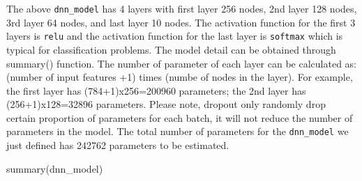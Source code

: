 \documentclass[
  12pt,
]{krantz}
\makeatletter
\newenvironment{Shaded}{\begin{snugshade}}{\end{snugshade}}
\newcommand{\FunctionTok}[1]{\textcolor[rgb]{0,0,0}{#1}}
\newcommand{\NormalTok}[1]{#1}
\newenvironment{kframe}{%
\medskip{}
\setlength{\fboxsep}{.8em}
 \def\at@end@of@kframe{}%
 \ifinner\ifhmode%
  \def\at@end@of@kframe{\end{minipage}}%
  \begin{minipage}{\columnwidth}%
 \fi\fi%
 \def\FrameCommand##1{\hskip\@totalleftmargin \hskip-\fboxsep
 \colorbox{shadecolor}{##1}\hskip-\fboxsep
     \hskip-\linewidth \hskip-\@totalleftmargin \hskip\columnwidth}%
 \MakeFramed {\advance\hsize-\width
   \@totalleftmargin\z@ \linewidth\hsize
   \@setminipage}}%
 {\par\unskip\endMakeFramed%
 \at@end@of@kframe}
\renewenvironment{Shaded}{\begin{kframe}}{\end{kframe}}
\makeatother
\begin{document}
The above \texttt{dnn\_model} has 4 layers with first layer 256 nodes, 2nd layer 128 nodes, 3rd layer 64 nodes, and last layer 10 nodes. The activation function for the first 3 layers is \texttt{relu} and the activation function for the last layer is \texttt{softmax} which is typical for classification problems. The model detail can be obtained through summary() function. The number of parameter of each layer can be calculated as: (number of input features +1) times (numbe of nodes in the layer). For example, the first layer has (784+1)x256=200960 parameters; the 2nd layer has (256+1)x128=32896 parameters. Please note, dropout only randomly drop certain proportion of parameters for each batch, it will not reduce the number of parameters in the model. The total number of parameters for the \texttt{dnn\_model} we just defined has 242762 parameters to be estimated.

\begin{Shaded}
\begin{Highlighting}[]
\FunctionTok{summary}\NormalTok{(dnn\_model)}
\end{Highlighting}
\end{Shaded}
\end{document}
